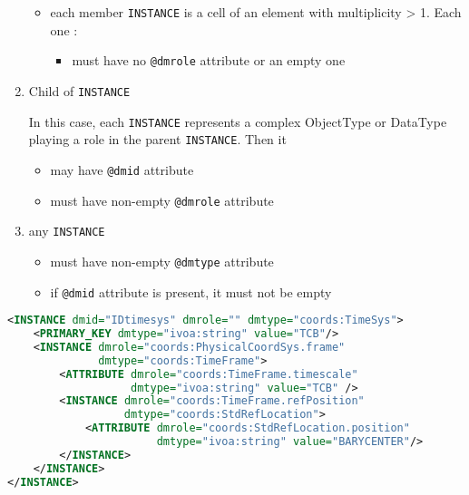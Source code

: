\begin{enumerate}
\begin{itemize}
     \item each member \texttt{INSTANCE} is a cell of an element with multiplicity > 1.
          Each one :             
           \begin{itemize}
             \item must have no  \texttt{@dmrole} attribute or an empty one
           \end{itemize}
  \end{itemize}  
    
\item Child of \texttt{INSTANCE}

     In this case, each \texttt{INSTANCE} represents 
     a complex ObjectType or DataType playing a role in the parent \texttt{INSTANCE}.
     Then it     
     \begin{itemize}
        \item may have  \texttt{@dmid} attribute
        \item must have non-empty  \texttt{@dmrole} attribute
     \end{itemize}
           
\item any \texttt{INSTANCE}

   \begin{itemize}
   	 \item must have non-empty  \texttt{@dmtype} attribute
	 \item if  \texttt{@dmid} attribute is present, it must not be empty    
    \end{itemize}
\end{enumerate}  
    
   
\begin{lstlisting}[caption={Example of an \texttt{INSTANCE} child of \texttt{INSTANCE} (see line~\ref{INSTANCE_snippet} in Appendix~\ref{appendix_A}). It must have a role as a component of the enclosing \texttt{INSTANCE}.},language=XML]
 <INSTANCE dmid="IDtimesys" dmrole="" dmtype="coords:TimeSys">
    <PRIMARY_KEY dmtype="ivoa:string" value="TCB"/>
    <INSTANCE dmrole="coords:PhysicalCoordSys.frame" 
              dmtype="coords:TimeFrame">
        <ATTRIBUTE dmrole="coords:TimeFrame.timescale" 
                   dmtype="ivoa:string" value="TCB" />
        <INSTANCE dmrole="coords:TimeFrame.refPosition" 
                  dmtype="coords:StdRefLocation">
            <ATTRIBUTE dmrole="coords:StdRefLocation.position" 
                       dmtype="ivoa:string" value="BARYCENTER"/>
        </INSTANCE>
    </INSTANCE>
</INSTANCE>
\end{lstlisting}   

